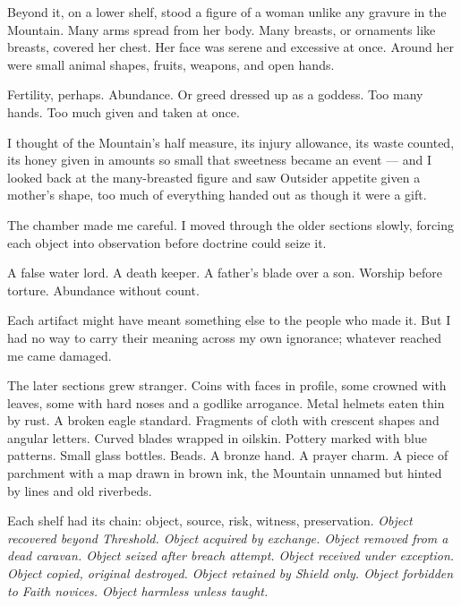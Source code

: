 Beyond it, on a lower shelf, stood a figure of a woman unlike any gravure in the Mountain. Many arms spread from her body. Many breasts, or ornaments like breasts, covered her chest. Her face was serene and excessive at once. Around her were small animal shapes, fruits, weapons, and open hands.\par

Fertility, perhaps. Abundance. Or greed dressed up as a goddess. Too many hands. Too much given and taken at once.\par

I thought of the Mountain's half measure, its injury allowance, its waste counted, its honey given in amounts so small that sweetness became an event --- and I looked back at the many-breasted figure and saw Outsider appetite given a mother's shape, too much of everything handed out as though it were a gift.\par

The chamber made me careful. I moved through the older sections slowly, forcing each object into observation before doctrine could seize it.\par

A false water lord. A death keeper. A father's blade over a son. Worship before torture. Abundance without count.\par

Each artifact might have meant something else to the people who made it. But I had no way to carry their meaning across my own ignorance; whatever reached me came damaged.\par

The later sections grew stranger. Coins with faces in profile, some crowned with leaves, some with hard noses and a godlike arrogance. Metal helmets eaten thin by rust. A broken eagle standard. Fragments of cloth with crescent shapes and angular letters. Curved blades wrapped in oilskin. Pottery marked with blue patterns. Small glass bottles. Beads. A bronze hand. A prayer charm. A piece of parchment with a map drawn in brown ink, the Mountain unnamed but hinted by lines and old riverbeds.\par

Each shelf had its chain: object, source, risk, witness, preservation. \textit{Object recovered beyond Threshold. Object acquired by exchange. Object removed from a dead caravan. Object seized after breach attempt. Object received under exception. Object copied, original destroyed. Object retained by Shield only. Object forbidden to Faith novices. Object harmless unless taught.}\par

